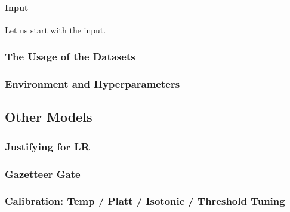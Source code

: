 \documentclass[12pt]{article}
\begin{document}
\paragraph{Input}
Let us start with the input.

\subsubsection{The Usage of the Datasets}

\subsubsection{Environment and Hyperparameters}

\subsection{Other Models}
\subsubsection{Justifying for LR}
\subsubsection{Gazetteer Gate}
\subsubsection{Calibration: Temp / Platt / Isotonic / Threshold Tuning}

\end{document}
